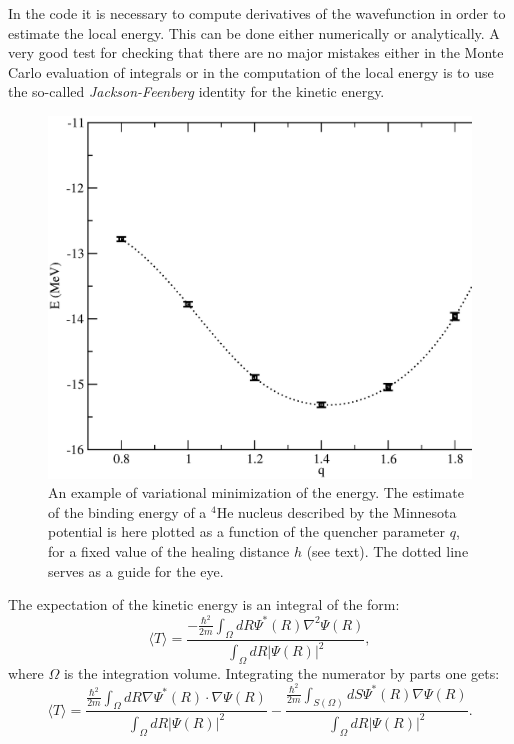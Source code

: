 In the code it is necessary to compute derivatives of the wavefunction in order to estimate the local energy. This can be done either numerically or analytically. A very good test for checking that there are no major mistakes either in the Monte Carlo evaluation of integrals or in the computation of the local energy is to use the so-called {\it Jackson-Feenberg} identity for the kinetic energy.
\begin{figure}
	\begin{center}
		\includegraphics[scale=0.5]{Chapter9-figures/qvar.eps}
	\end{center}
	\caption{An example of variational minimization of the energy. The estimate of the binding energy of a $^4$He nucleus described by the Minnesota potential is here plotted as a function of the quencher parameter $q$, for a fixed value of the healing distance $h$ (see text). The dotted line serves as a guide for the eye.}
	\label{fig.var}
\end{figure}
The expectation of the kinetic energy is an integral of the form:
\begin{equation}
\label{T_PB}
\langle T\rangle = \frac{\displaystyle-\frac{\hbar^2}{2m}\int_\Omega dR \Psi^*(R)\nabla^2\Psi(R)}{\displaystyle\int_\Omega dR |\Psi(R)|^2},
\end{equation}
where $\Omega$ is the integration volume. Integrating the numerator by parts one gets:
\begin{equation}
\langle T\rangle = \frac{\displaystyle\frac{\hbar^2}{2m}\int_\Omega dR \nabla\Psi^*(R)\cdot\nabla\Psi(R)}{\displaystyle\int_\Omega dR |\Psi(R)|^2} -\frac{\displaystyle\frac{\hbar^2}{2m}\int_{S(\Omega)} dS\Psi^*(R)\nabla\Psi(R) }{\displaystyle\int_\Omega dR |\Psi(R)|^2}.
\end{equation}
